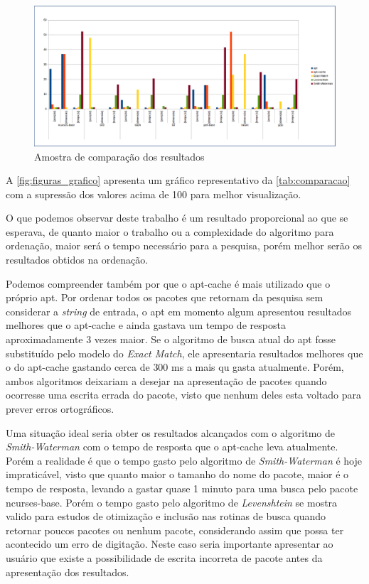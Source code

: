 \begin{figure}[h]
  \centering
	\includegraphics[width=\textwidth,angle=0]{figuras/grafico}
  \caption{Amostra de comparação dos resultados}
  \label{fig:figuras_grafico}
\end{figure}

A \autoref{fig:figuras_grafico} apresenta um gráfico representativo da \autoref{tab:comparacao} com a supressão dos valores acima de 100  para melhor visualização.

O que podemos observar deste trabalho é um resultado proporcional ao que se esperava, de quanto maior o trabalho ou a complexidade do algoritmo para ordenação, maior será o tempo necessário para a pesquisa, porém melhor serão os resultados obtidos na ordenação.

Podemos compreender também por que o {\code apt-cache} é mais utilizado que o próprio {\code apt}. Por ordenar todos os pacotes que retornam da pesquisa sem considerar a \textit{string} de entrada, o {\code apt} em momento algum apresentou resultados melhores que o {\code apt-cache} e ainda gastava um tempo de resposta aproximadamente 3 vezes maior. Se o algoritmo de busca atual do {\code apt} fosse substituído pelo modelo do \textit{Exact Match}, ele apresentaria resultados melhores que o do {\code apt-cache} gastando cerca de $300$ ms a mais qu gasta atualmente. Porém, ambos algoritmos deixariam a desejar na apresentação de pacotes quando ocorresse uma escrita errada do pacote, visto que nenhum deles esta voltado para prever erros ortográficos.

Uma situação ideal seria obter os resultados alcançados com o algoritmo de \textit{Smith-Waterman} com o tempo de resposta que o {\code apt-cache} leva atualmente. Porém a realidade é que o tempo gasto pelo algoritmo de \textit{Smith-Waterman} é hoje impraticável, visto que quanto maior o tamanho do nome do pacote, maior é o tempo de resposta, levando a gastar quase 1 minuto para uma busca pelo pacote {\code ncurses-base}. Porém o tempo gasto pelo algoritmo de 
\textit{Levenshtein} se mostra valido para estudos de otimização e inclusão nas rotinas de busca quando retornar poucos pacotes ou nenhum pacote, considerando assim que possa ter acontecido um erro de digitação. Neste caso seria importante apresentar ao usuário que existe a possibilidade de escrita incorreta de pacote antes da apresentação dos resultados.